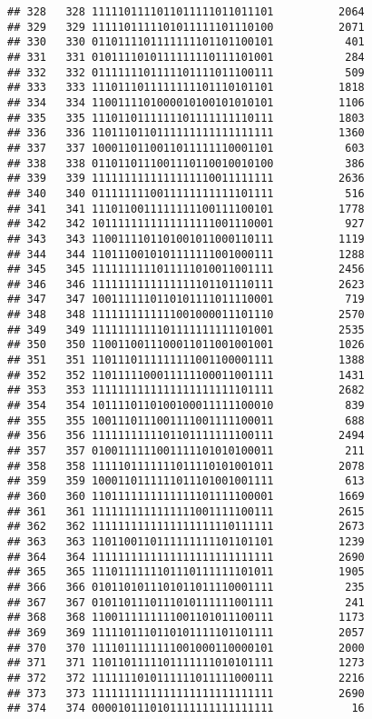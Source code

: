 \documentclass[]{article}
\begin{document}
\begin{verbatim}
## 328   328 1111101111011011111011011101          2064
## 329   329 1111101111101011111101110100          2071
## 330   330 0110111101111111101101100101           401
## 331   331 0101111010111111110111101001           284
## 332   332 0111111101111101111011100111           509
## 333   333 1110111011111111101110101101          1818
## 334   334 1100111101000010100101010101          1106
## 335   335 1110110111111101111111110111          1803
## 336   336 1101110110111111111111111111          1360
## 337   337 1000110110011011111110001101           603
## 338   338 0110110111001110110010010100           386
## 339   339 1111111111111111110011111111          2636
## 340   340 0111111110011111111111101111           516
## 341   341 1110110011111111100111100101          1778
## 342   342 1011111111111111111001110001           927
## 343   343 1100111101101001011000110111          1119
## 344   344 1101110010101111111001000111          1288
## 345   345 1111111111011111010011001111          2456
## 346   346 1111111111111111101101110111          2623
## 347   347 1001111110110101111011110001           719
## 348   348 1111111111111001000011101110          2570
## 349   349 1111111111101111111111101001          2535
## 350   350 1100110011100011011001001001          1026
## 351   351 1101110111111111001100001111          1388
## 352   352 1101111100011111100011001111          1431
## 353   353 1111111111111111111111101111          2682
## 354   354 1011110110100100011111100010           839
## 355   355 1001110111001111001111100011           688
## 356   356 1111111111101101111111100111          2494
## 357   357 0100111111001111101010100011           211
## 358   358 1111101111111011110101001011          2078
## 359   359 1000110111111011101001001111           613
## 360   360 1101111111111111101111100001          1669
## 361   361 1111111111111111001111100111          2615
## 362   362 1111111111111111111110111111          2673
## 363   363 1101100110111111111101101101          1239
## 364   364 1111111111111111111111111111          2690
## 365   365 1110111111101110111111101011          1905
## 366   366 0101101011101011011110001111           235
## 367   367 0101101110111010111111001111           241
## 368   368 1100111111111001101011100111          1173
## 369   369 1111101110110101111101101111          2057
## 370   370 1111011111111001000110000101          2000
## 371   371 1101101111101111111010101111          1273
## 372   372 1111111010111111011111000111          2216
## 373   373 1111111111111111111111111111          2690
## 374   374 0000101110101111111111111111            16

\end{verbatim}
\end{document}
